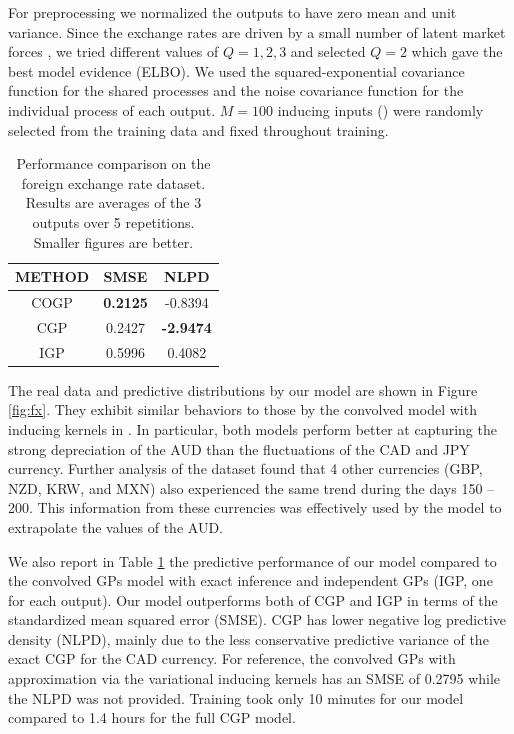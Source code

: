 For preprocessing we normalized the outputs to have zero mean and unit variance.
Since the exchange rates are driven by a small number of latent market forces \citep[see e.g.][]{alvarez2010efficient}, we tried different values of $Q = {1,2,3}$ and selected $Q = 2$ which gave the best model evidence (ELBO).
We used the squared-exponential covariance function for the shared processes and the noise covariance function for the individual process of each output.
$M = 100$ inducing inputs () were randomly selected from the training data and fixed throughout training.

\setlength{\tabcolsep}{4pt}
\begin{table}[t]
\caption{Performance comparison on the foreign exchange rate dataset. Results are averages of the 3 outputs over 5 repetitions. Smaller figures are better.}
\label{tab:fx}
\begin{center}
\begin{tabular}{ccc}
\toprule
\textbf{METHOD} & \textbf{SMSE} & \textbf{NLPD} \\ \hline
COGP  & \textbf{0.2125} & -0.8394 \\
CGP & 0.2427 & \textbf{-2.9474} \\
IGP & 0.5996 & 0.4082 \\
\bottomrule
\end{tabular}
\end{center}
\end{table}

The real data and predictive distributions by our model are shown in Figure \ref{fig:fx}.
They exhibit similar behaviors to those by the convolved model with inducing kernels in \citet{alvarez2010efficient}.
In particular, both models perform better at capturing the strong depreciation of the AUD than the fluctuations of the CAD and JPY currency.
Further analysis of the dataset found that 4 other currencies (GBP, NZD, KRW, and MXN) also experienced the same trend during the days 
150 -- 200.
This information from these currencies was effectively used by the model to extrapolate the values of the AUD.

We also report in Table \ref{tab:fx} the predictive performance of our model compared to the convolved GPs model with exact inference \citep[CGP,][]{alvarez-lawrence-nips-08} and independent GPs (IGP, one for each output).
Our model outperforms both of CGP and IGP in terms of the standardized mean squared error (SMSE).
CGP has lower negative log predictive density (NLPD), mainly due to the less conservative predictive variance of the exact CGP for the CAD currency.
For reference, the convolved GPs with approximation via the variational inducing kernels  \citep[CGPVAR,][]{alvarez2010efficient} 
has an SMSE of 0.2795 while the NLPD was not provided.
Training took only 10 minutes for our model compared to 1.4 hours for the full CGP model.

